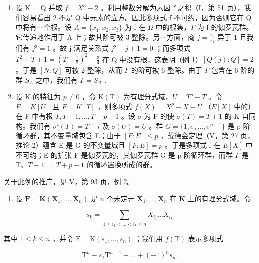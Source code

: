\begin{enumerate}
\def\labelenumi{\arabic{enumi})}
\setcounter{enumi}{2}
\item
  设 K = Q 并取 \(f = X^{3} - 2\) 。利用整数分解为素因子之积（I，第 51 页），我们容易看出 2 不是 Q 中元素的立方。因此多项式 f 不可约，因为否则它在 Q 中将有一个根。设 \(A = \{x_{1}, x_{2}, x_{3}\}\) 为 f 在 \(\Omega\) 中的根集，\(\Gamma\) 为 f 的伽罗瓦群。它传递地作用于 A 上；故其阶可被 3 整除。另一方面，商 \(j = \frac{x_{2}}{x_{1}}\) 异于 1 且我们有 \(j^{3} = 1\) 。故 j 满足关系式 \(j^{2} + j + 1 = 0\) ；而多项式 \(T^{2} + T + 1 = \left(T + \frac{1}{2}\right)^{2} + \frac{3}{4}\) 在 Q 中没有根，这表明（例 1）\([Q(j): Q] = 2\) 。于是 \([N: Q]\) 可被 2 整除，从而 \(\Gamma\) 的阶可被 6 整除。由于 \(\Gamma\) 包含在 6 阶的群 \(S_{A}\) 之中，我们有 \(\Gamma = S_{A}\) .
\item
  设 K 的特征为 \(p \neq 0\) ，令 \(\mathrm{K}(\mathrm{T})\) 为有理分式域，\(U = T^{p} - T\) 。令 \(E = K[U]\) 且 \(F = K[T]\) ，则多项式 \(f(X) = X^{p} - X - U\) （\(E[X]\) 中的）在 F 中有根 \(T, T + 1, \ldots, T + p - 1\) 。设 \(\sigma\) 为 F 的使 \(\sigma(T) = T + 1\) 的 K-自同构。我们有 \(\sigma^{i}(T) = T + i\) 及 \(\sigma(U) = U\) 。群 \(G = \{1, \sigma, \ldots, \sigma^{p-1}\}\) 是 p 阶循环群，其不变量域包含 E；由于 \([F: E] \leqslant p\) ，戴德金定理（V，第 27 页，推论 2）蕴含 E 是 G 的不变量域且 \([F: E] = p\) 。于是多项式 f 在 \(E[X]\) 中不可约；E 的扩张 F 是伽罗瓦的，其伽罗瓦群 G 是 p 阶循环群，而群 \(\Gamma\) 是 T、\(T + 1, \ldots, T + p - 1\) 的循环置换所成的群。
\end{enumerate}

关于此例的推广，见 V，第 93 页，例 2。

\begin{enumerate}
\def\labelenumi{\arabic{enumi})}
\setcounter{enumi}{4}
\tightlist
\item
  设 \(\mathbf{F} = \mathbf{K}(\mathbf{X}_1, \ldots, \mathbf{X}_n)\) 是 \(n\) 个未定元 \(\mathbf{X}_1, \ldots, \mathbf{X}_n\) 在 \(\mathbf{K}\) 上的有理分式域。令
\end{enumerate}

\[
s _ {k} = \sum_ {1 \leqslant i _ {1} <   \dots <   i _ {k} \leqslant n} X _ {i _ {1}} \dots X _ {i _ {k}}
\]

其中 \(1 \leqslant k \leqslant n\) ，并令 \(\mathrm{E} = \mathrm{K}(s_1, \ldots, s_n)\) ；我们用 \(f(\mathrm{T})\) 表示多项式

\[
\mathrm{T} ^ {n} - s _ {1} \mathrm{T} ^ {n - 1} + \dots + (- 1) ^ {n} s _ {n}.
\]

